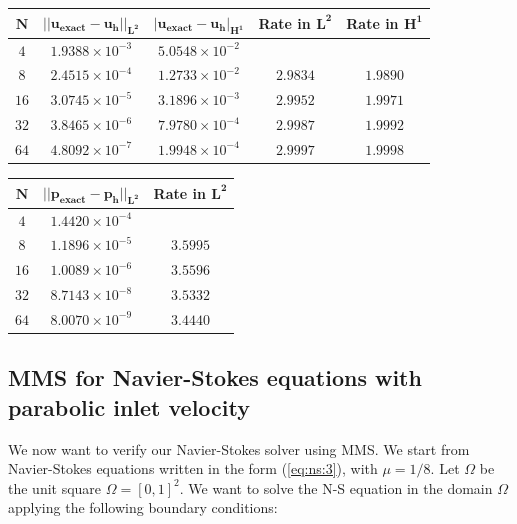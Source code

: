 \documentclass[a4paper,11pt,oneside]{book}
\begin{document}
\begin{center}
\begin{tabular}{| c | c | c | c | c |}
\hline
$  \mathbf{N}$ & $ \mathbf{|| u_{exact} - u_h ||_{L^2}}$ & $  \mathbf{ | u_{exact} - u_h |_{H^1}}$ & \textbf{Rate in }  $ \mathbf{L^2}$ & \textbf{Rate in } $  \mathbf{H^1}$  \\
\hline
$ 4 $ & $1.9388 \times 10^{-3}$ & $5.0548 \times 10^{-2}$  & & \\
\hline
$ 8$ & $2.4515  \times 10^{-4}$ & $1.2733 \times 10^{-2}$ &  $2.9834$ &  $1.9890$   \\
\hline
$ 16 $ & $ 3.0745 \times 10^{-5}$ & $3.1896 \times 10^{-3}$ & $ 2.9952 $ & $1.9971$   \\
\hline
$ 32$ & $3.8465 \times 10^{-6}$ & $7.9780 \times 10^{-4}$ & $ 2.9987 $ & $ 1.9992 $  \\
\hline
$ 64$ & $4.8092 \times 10^{-7}$ & $1.9948 \times 10^{-4}$  & $ 2.9997 $ & $1.9998$ \\
\hline
\end{tabular}
\end{center}



\begin{center}
\begin{tabular}{| c | c | c |}
\hline
$\mathbf{N}$ & $\mathbf{|| p_{exact} - p_h ||_{L^2}}$ & \textbf{Rate in } $  \mathbf{L^2}$  \\
\hline
$ 4 $ & $1.4420  \times 10^{-4} $ & \\
\hline
$ 8 $ & $ 1.1896  \times 10^{-5} $ & $3.5995$ \\
\hline
$ 16 $ & $ 1.0089  \times 10^{-6} $ & $3.5596$ \\
\hline
$ 32 $ & $  8.7143 \times 10^{-8} $ & $3.5332$ \\
\hline
$ 64 $ & $ 8.0070 \times 10^{-9} $ & $3.4440$ \\
\hline
\end{tabular}
\end{center}


\subsection{MMS for Navier-Stokes equations with parabolic inlet velocity}
\label{parabolic inlet}
We now want to verify our Navier-Stokes solver using MMS. We start from Navier-Stokes equations written in the form (\ref{eq:ns:3}), with $\mu = 1/8$.  Let $\Omega$ be the unit square $\Omega = [0,1]^2$. We want to solve the N-S equation in the domain $\Omega$ applying the following boundary conditions:
\end{document}
